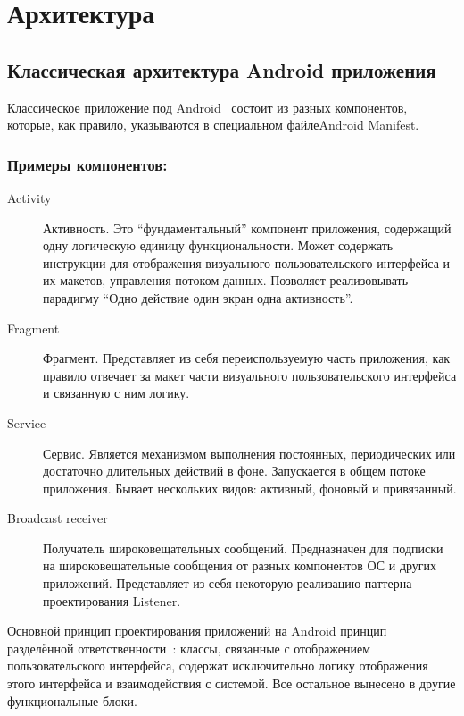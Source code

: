 \chapter{Архитектура}
\section{Классическая архитектура Android приложения}
Классическое приложение под Android~\autocite{app_arch} состоит из разных компонентов, которые, как правило, указываются в специальном файле\textemdash\space Android Manifest.

\subsection*{Примеры компонентов:}
\begin{description}
	\item[Activity~\autocite{android_activities}] Активность. Это ``фундаментальный'' компонент приложения, содержащий одну логическую единицу функциональности. Может содержать инструкции для отображения визуального пользовательского интерфейса и их макетов, управления потоком данных. Позволяет реализовывать парадигму ``Одно действие \textemdash\space один экран \textemdash\space одна активность''.
	\item[Fragment~\autocite{android_fragment}] Фрагмент. Представляет из себя переиспользуемую часть приложения, как правило отвечает за макет части визуального пользовательского интерфейса и связанную с ним логику.
	\item[Service~\autocite{android_service}] Сервис. Является механизмом выполнения постоянных, периодических или достаточно длительных действий в фоне. Запускается в общем потоке приложения. Бывает нескольких видов: активный, фоновый и привязанный.
	\item[Broadcast receiver~\autocite{android_broasdcast}] Получатель широковещательных сообщений. Предназначен для подписки на широковещательные сообщения от разных компонентов ОС и других приложений. Представляет из себя некоторую реализацию паттерна проектирования Listener.
\end{description}
\smallskip
Основной принцип проектирования приложений на Android \textemdash\space принцип разделённой ответственности~\autocite{separation_of_concern}: классы, связанные с отображением пользовательского интерфейса, содержат исключительно логику отображения этого интерфейса и взаимодействия с системой. Все остальное вынесено в другие функциональные блоки.


